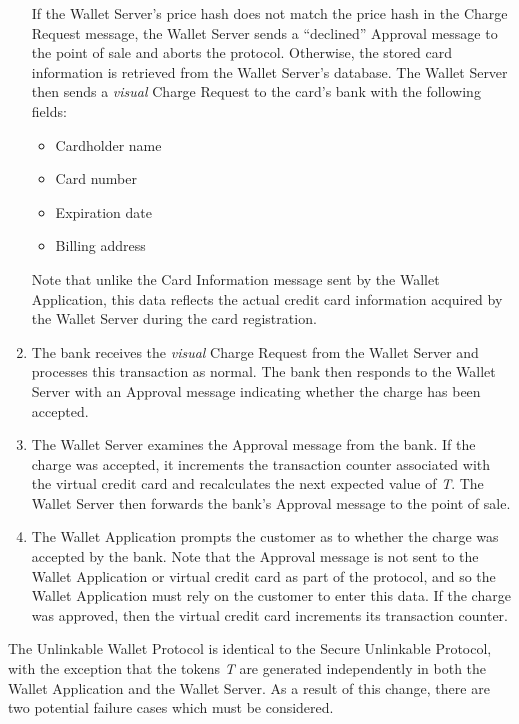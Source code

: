 \begin{enumerate}
    If the Wallet Server's price hash does not match the price hash in the Charge Request message,
        the Wallet Server sends a ``declined'' Approval message to the point of sale and aborts the protocol.
    Otherwise, the stored card information is retrieved from the Wallet Server's database.
    The Wallet Server then sends a \emph{visual} Charge Request to the card's bank with the following fields:
    \begin{itemize}
    \item Cardholder name
    \item Card number
    \item Expiration date
    \item Billing address
    \end{itemize}
    Note that unlike the Card Information message sent by the Wallet Application,
        this data reflects the actual credit card information acquired by the Wallet Server during the card registration.

\item The bank receives the \emph{visual} Charge Request from the Wallet Server and processes this transaction as normal.
    The bank then responds to the Wallet Server with an Approval message indicating whether the charge has been accepted.

\item The Wallet Server examines the Approval message from the bank.
    If the charge was accepted, it increments the transaction counter associated with the virtual credit card and recalculates the next expected value of \emph{T}.
    The Wallet Server then forwards the bank's Approval message to the point of sale.

\item The Wallet Application prompts the customer as to whether the charge was accepted by the bank.
    Note that the Approval message is not sent to the Wallet Application or virtual credit card as part of the protocol,
        and so the Wallet Application must rely on the customer to enter this data.
    If the charge was approved, then the virtual credit card increments its transaction counter.
\end{enumerate}

The Unlinkable Wallet Protocol is identical to the Secure Unlinkable Protocol,
    with the exception that the tokens \emph{T} are generated independently in both the Wallet Application and the Wallet Server.
As a result of this change, there are two potential failure cases which must be considered.

